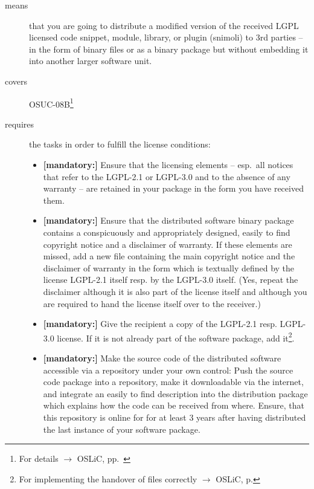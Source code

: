 \begin{description}
\item[means] that you are going to distribute a modified version of the received
LGPL licensed code snippet, module, library, or plugin (snimoli) to 3rd parties
-- in the form of binary files or as a binary package but without embedding it
into another larger software unit.
\item[covers] OSUC-08B\footnote{For details $\rightarrow$ OSLiC, pp.\ \pageref{OSUC-08-DEF}}
\item[requires] the tasks in order to fulfill the license conditions:
\begin{itemize}

  \item \textbf{[mandatory:]} Ensure that the licensing elements -- esp.\ all
  notices that refer to the LGPL-2.1 or LGPL-3.0 and to the absence of any
  warranty -- are retained in your package in the form you have received them.

  \item \textbf{[mandatory:]} Ensure that the distributed software binary
  package contains a conspicuously and appropriately designed, easily to find
  copyright notice and a disclaimer of warranty. If these elements are missed,
  add a new file containing the main copyright notice and the disclaimer of
  warranty in the form which is textually defined by the license LGPL-2.1 itself
  resp. by the LGPL-3.0 itself. (Yes, repeat the disclaimer although it is also
  part of the license itself and although you are required to hand the license
  itself over to the receiver.)
  
  \item \textbf{[mandatory:]} Give the recipient a copy of the LGPL-2.1 resp.
  LGPL-3.0 license. If it is not already part of the software package, add
  it\footnote{For implementing the handover of files correctly $\rightarrow$
  OSLiC, p. \pageref{DistributingFilesHint}}.

  \item \textbf{[mandatory:]} Make the source code of the distributed software
  accessible via a repository under your own control: Push the source code
  package into a repository, make it downloadable via the internet, and
  integrate an easily to find description into the distribution package which
  explains how the code can be received from where. Ensure, that this repository
  is online for for at least 3 years after having distributed the last instance
  of your software package.
  

\end{itemize}
\end{description}
